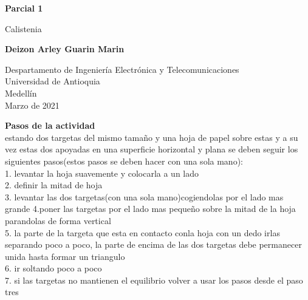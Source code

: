 \documentclass{article}
\begin{document}
\begin{titlepage}
    \begin{center}
        \vspace*{1cm}
            
        \Huge
        \textbf{Parcial 1}
            
        \vspace{0.5cm}
        \LARGE
        Calistenia
            
        \vspace{1.5cm}
            
        \textbf{Deizon Arley Guarin Marin}
            
        \vfill
            
        \vspace{0.8cm}
            
        \Large
        Despartamento de Ingeniería Electrónica y Telecomunicaciones\\
        Universidad de Antioquia\\
        Medellín\\
        Marzo de 2021
            
    \end{center}
\end{titlepage}


\newpage
\textbf{Pasos de la actividad}\\
estando dos targetas del mismo tamaño y una hoja de papel sobre estas y a su vez
estas dos apoyadas en una superficie horizontal y plana se deben seguir los siguientes pasos(estos pasos se deben hacer con una sola mano):\\
1. levantar la hoja suavemente y colocarla a un lado\\
2. definir la mitad de hoja\\
3. levantar las dos targetas(con una sola mano)cogiendolas por el lado mas grande
4.poner las targetas por el lado mas pequeño sobre la mitad de la hoja parandolas de forma vertical\\
5. la parte de la targeta que esta en contacto conla hoja con un dedo irlas separando poco a poco, la parte de encima de las dos targetas debe permanecer unida hasta formar un triangulo\\
6. ir soltando poco a poco\\
7. si las targetas no mantienen el equilibrio volver  a usar los pasos desde el paso tres\\
\end{document}
